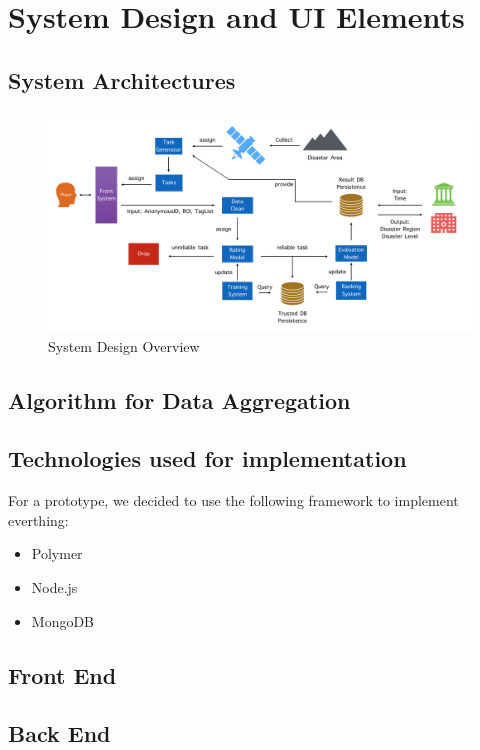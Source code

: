 \section{System Design and UI Elements}

\subsection{System Architectures}

    \begin{figure}[htp]
    \centering
    \includegraphics[width=\textwidth]{figures/system}
    \caption{System Design Overview}
    \label{fig:roiweight}
    \end{figure}

\subsection{Algorithm for Data Aggregation}
\subsection{Technologies used for implementation}

  For a prototype, we decided to use the following framework to implement everthing:

  \begin{itemize}
    \item Polymer
    \item Node.js
    \item MongoDB
  \end{itemize}
  \subsection{Front End}
  \subsection{Back End}
  
